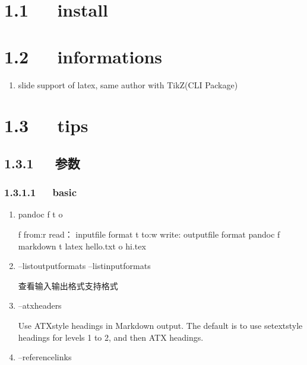 \documentclass[letterpaper,12pt,english]{sphinxmanual}
\begin{document}
\section{1.1   install}
\label{\detokenize{001software/001install/pandoc:install}}

\section{1.2   informations}
\label{\detokenize{001software/001install/pandoc:informations}}\begin{enumerate}
%
\item {} 

slide support of latex, same author with TikZ(CLI Package)

\end{enumerate}


\section{1.3   tips}
\label{\detokenize{001software/001install/pandoc:tips}}

\subsection{1.3.1   参数}
\label{\detokenize{001software/001install/pandoc:id2}}

\subsubsection{1.3.1.1   basic}
\label{\detokenize{001software/001install/pandoc:basic}}\begin{enumerate}
%
\item {} 
pandoc \sphinxhyphen{}f \sphinxhyphen{}t \sphinxhyphen{}o

\begin{sphinxVerbatim}[commandchars=\\\{\}]
\PYGZhy{}f \PYGZhy{}\PYGZhy{}from:\PYGZhy{}r \PYGZhy{}\PYGZhy{}read： inputfile format
\PYGZhy{}t \PYGZhy{}\PYGZhy{}to:\PYGZhy{}w \PYGZhy{}\PYGZhy{}write: outputfile format
pandoc \PYGZhy{}f markdown \PYGZhy{}t latex hello.txt \PYGZhy{}o hi.tex
\end{sphinxVerbatim}

\item {} 
–list\sphinxhyphen{}output\sphinxhyphen{}formats –list\sphinxhyphen{}input\sphinxhyphen{}formats

查看输入输出格式支持格式

\item {} 
–atx\sphinxhyphen{}headers

Use ATX\sphinxhyphen{}style headings in Markdown output. The default is to use
setext\sphinxhyphen{}style headings for levels 1 to 2, and then ATX headings.

\item {} 
–reference\sphinxhyphen{}links

\end{enumerate}
\end{document}
